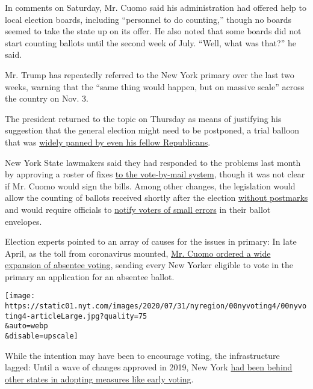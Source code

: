 In comments on Saturday, Mr. Cuomo said his administration had offered
help to local election boards, including ``personnel to do counting,''
though no boards seemed to take the state up on its offer. He also noted
that some boards did not start counting ballots until the second week of
July. ``Well, what was that?'' he said.

Mr. Trump has repeatedly referred to the New York primary over the last
two weeks, warning that the ``same thing would happen, but on massive
scale'' across the country on Nov. 3.

The president returned to the topic on Thursday as means of justifying
his suggestion that the general election might need to be postponed, a
trial balloon that was
\href{https://www.nytimes.com/2020/07/31/us/politics/trump-tweet-democracy.html}{widely
panned by even his fellow Republicans}.

New York State lawmakers said they had responded to the problems last
month by approving a roster of fixes
\href{https://www.nysenate.gov/newsroom/press-releases/senate-majority-advances-automatic-voter-registration-system-strengthens}{to
the vote-by-mail system}, though it was not clear if Mr. Cuomo would
sign the bills. Among other changes, the legislation would allow the
counting of ballots received shortly after the election
\href{https://www.nysenate.gov/legislation/bills/2019/s8799/amendment/a}{without
postmarks} and would require officials to
\href{https://www.nysenate.gov/legislation/bills/2019/s8370/amendment/b}{notify
voters of small errors} in their ballot envelopes.

Election experts pointed to an array of causes for the issues in
primary: In late April, as the toll from coronavirus mounted,
\href{https://www.governor.ny.gov/news/amid-ongoing-covid-19-pandemic-governor-cuomo-issues-executive-order-make-sure-every-new-yorker}{Mr.
Cuomo ordered a wide expansion of absentee voting}, sending every New
Yorker eligible to vote in the primary an application for an absentee
ballot.

\texttt{[image: https://static01.nyt.com/images/2020/07/31/nyregion/00nyvoting4/00nyvoting4-articleLarge.jpg?quality=75\\\&auto=webp\\\&disable=upscale]}

While the intention may have been to encourage voting, the
infrastructure lagged: Until a wave of changes approved in 2019, New
York
\href{https://www.nytimes.com/2019/01/10/nyregion/voting-reform-election-ny.html}{had
been behind other states in adopting measures like early voting}.

